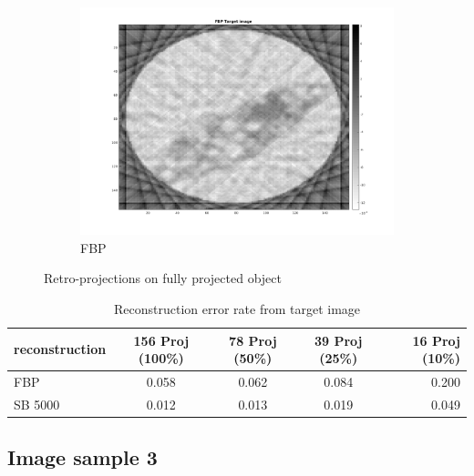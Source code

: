 \documentclass[10pt,a4paper,titlepage]{article}
\begin{document}
\begin{figure}[H]
\begin{subfigure}[b]{0.32\textwidth}
            	\centering 
            	\includegraphics[width=\textwidth]{Sample2/L-D_5000/FBP16.png}
            	\caption{FBP}    
            	\label{subfig:FBP216p}
        	\end{subfigure}
       		
       		
       		
        	\caption{Retro-projections on fully projected object}
        	\label{fig:retFully}
        	
    	\end{figure}

		\begin{table}[H]
			\begin{tabular}{ | l || c | c | c | r | }
 				\hline			
   				reconstruction	& 156 Proj (100\%)	& 78 Proj (50\%)	& 39 Proj (25\%)	& 16 Proj (10\%)  \\
   				\hline
  				FBP			    &  0.058			& 0.062				& 0.084				& 0.200\\
 				\hline  
 				SB 5000			&  0.012			& 0.013				& 0.019				& 0.049\\
 				\hline 
 			\end{tabular}
 			\caption{Reconstruction error rate from target image}
 			\label{tab:Error2000Sample2}
		\end{table}

\clearpage

	\subsection{Image sample 3}
\end{document}
